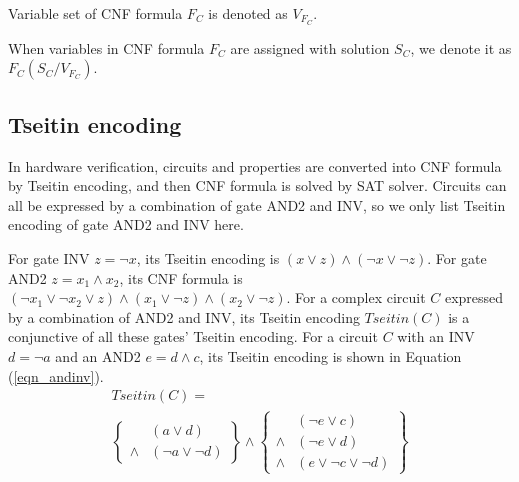 \documentclass[conference,compsocconf]{IEEEtran}
\newtheorem{definition}{\textbf{Definition}}
\begin{document}
Variable set of CNF formula $F_C$ is denoted as $V_{F_C}$.

When variables in CNF formula $F_C$ are assigned with solution $S_C$, we denote it as $F_C(S_C/V_{F_C})$.

\subsection{Tseitin encoding}

In hardware verification,
circuits and properties are converted into CNF formula by Tseitin encoding\cite{Tseitin},
and then CNF formula is solved by SAT solver.
Circuits can all be expressed by a combination of gate AND2 and INV,
so we only list Tseitin encoding of gate AND2 and INV here.

For gate INV $z=\neg x$,
its Tseitin encoding is  $(x\vee z)\wedge( \neg x\vee \neg z)$.
For gate AND2 $z=x_1\wedge x_2$,
its CNF formula is $( \neg x_1\vee \neg x_2\vee z)\wedge(x_1\vee \neg z) \wedge(x_2\vee \neg z)$.
For a complex circuit $C$ expressed by a combination of AND2 and INV,
its Tseitin encoding $Tseitin(C)$ is a conjunctive of all these gates' Tseitin encoding.
For a circuit $C$ with an INV $d=\neg a$ and an AND2 $e=d\wedge c$,
its Tseitin encoding is shown in Equation (\ref{eqn_andinv}).
\begin{multline}\label{eqn_andinv}
Tseitin(C)=\\
\left\{
\begin{array}{cc}
& (a\vee d) \\
\wedge & (\neg a\vee \neg d)
\end{array}
\right\}\wedge\left\{
\begin{array}{cc}
& (\neg e\vee c) \\
\wedge & (\neg e\vee d) \\
\wedge & (e\vee \neg c\vee\neg d)
\end{array}
\right\}
\end{multline}
\end{document}
